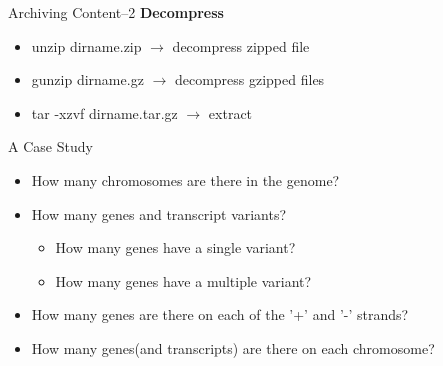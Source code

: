 \begin{frame}[t]{Archiving Content--2}
	\textbf{Decompress}
	\begin{itemize}
		\item unzip dirname.zip
		$\rightarrow$ decompress zipped file	
		\item gunzip dirname.gz $\rightarrow$ decompress gzipped files		
		\item tar -xzvf dirname.tar.gz	$\rightarrow$ extract
	\end{itemize}
\end{frame}


\begin{frame}[t]{A Case Study}
	\begin{itemize}
		\item How many chromosomes are there in the genome?
		\item How many genes and transcript variants?
		\begin{itemize}
			\item How many genes have a single variant?  
			\item How many genes have a multiple variant?
		\end{itemize}
		\item How many genes are there on each of the '+' and '-' strands?
		\item How many genes(and transcripts) are there on each chromosome?
	\end{itemize}
\end{frame}



